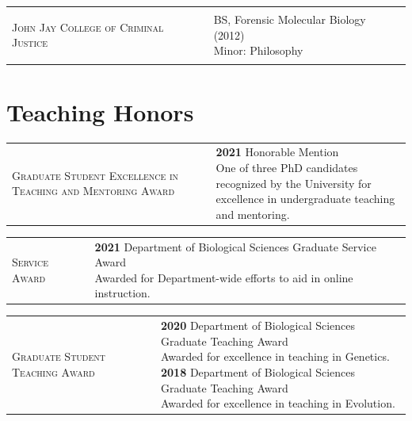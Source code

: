 \documentclass[]{article}
\begin{document}
\begin{tabular}{l | l}
\parbox{0.30\textwidth}{
\begin{center}
\textsc{John Jay College of Criminal Justice}
\end{center}
}
&
\parbox{0.65\textwidth}{
BS, Forensic Molecular Biology (2012)\\
Minor: Philosophy
}
\end{tabular}

\section{\fontsize{16}{48}\selectfont Teaching Honors}
\begin{tabular}{l | l}
\parbox{0.30\textwidth}{
\begin{center}
\textsc{Graduate Student Excellence in Teaching and Mentoring Award}
\end{center}
}
&
\parbox{0.70\textwidth}{
\textbf{2021} Honorable Mention\\
One of three PhD candidates recognized by the University for\\ excellence in undergraduate teaching and mentoring.
}
\end{tabular}

\vspace{3mm}

\begin{tabular}{l | l}
\parbox{0.30\textwidth}{
\begin{center}
\textsc{Service Award}
\end{center}
}
&
\parbox{0.70\textwidth}{
\textbf{2021} Department of Biological Sciences Graduate Service Award\\
Awarded for Department-wide efforts to aid in online instruction.
}
\end{tabular}

\vspace{3mm}

\begin{tabular}{l | l}
\parbox{0.30\textwidth}{
\begin{center}
\textsc{Graduate Student Teaching Award}
\end{center}
}
&
\parbox{0.70\textwidth}{
\textbf{2020} Department of Biological Sciences Graduate Teaching Award\\
Awarded for excellence in teaching in Genetics.\\
\textbf{2018} Department of Biological Sciences Graduate Teaching Award\\
Awarded for excellence in teaching in Evolution.
}
\end{tabular}
\end{document}
